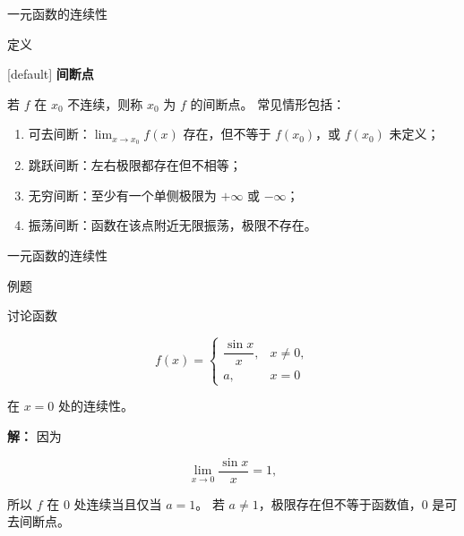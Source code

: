 \documentclass[aspectratio=169,10pt,fontset=fandol]{ctexbeamer}
\newenvironment{warning}{\par\noindent\textbf{注：}\quad}{\par\vspace{0.8em}}
\begin{document}
\begin{frame}[t,fragile]{一元函数的连续性}
\normalsize
\begin{block}{定义}
{\normalsize
{}[default]
\textbf{间断点}\par


若 $f$ 在 $x_0$ 不连续，则称 $x_0$ 为 $f$ 的间断点。 常见情形包括：

\begin{enumerate}[(1)]

\item 可去间断：$\lim_{x\to x_0}f(x)$ 存在，但不等于 $f(x_0)$，或 $f(x_0)$ 未定义；

\item 跳跃间断：左右极限都存在但不相等；

\item 无穷间断：至少有一个单侧极限为 \(+\infty\) 或 \(-\infty\)；

\item 振荡间断：函数在该点附近无限振荡，极限不存在。

\end{enumerate}


}
\end{block}
\end{frame}
\begin{frame}[t,fragile]{一元函数的连续性}
\normalsize
\begin{block}{例题}
{\normalsize
讨论函数

\[

f(x)=

\begin{cases}

\dfrac{\sin x}{x},&x\neq0,\\

a,&x=0

\end{cases}

\]

在 $x=0$ 处的连续性。


}
\end{block}
\pause
{\normalsize
\textbf{解：}
因为

\[

\lim_{x\to0}\frac{\sin x}{x}=1,

\]

所以 $f$ 在 $0$ 处连续当且仅当 $a=1$。 若 $a\neq1$，极限存在但不等于函数值，$0$ 是可去间断点。


}
\end{frame}
\end{document}
